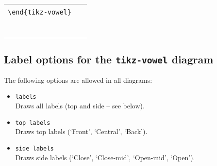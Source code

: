 \documentclass{article}
\newcommand{\pkg}[1]{\texttt{#1}}
\begin{document}
\begin{center}
\begin{tabular}{ll}
  \begin{minipage}[t]{6.5cm}{\small
    \verb|\begin{tikz-vowel}[triangle,three]|\\
    \verb|\end{tikz-vowel}|\\}
  \end{minipage} & 
  \begin{minipage}[t]{6.5cm}
  {~}
  \end{minipage} \\
  \begin{minipage}[t]{6.5cm}{
  \begin{tikz-vowel}\end{tikz-vowel} \\}\end{minipage} &
\end{tabular}
\end{center}



\subsection{Label options for the \pkg{tikz-vowel} diagram}
\label{sec:Label options for the tikz-vowel diagram}

\begin{minipage}[t]{\textwidth}
The following options are allowed in all diagrams:

\begin{itemize}\itemsep0pt
	\item \texttt{labels} \\\qquad Draws all labels (top and side -- see below).
	\item \texttt{top labels} \\\qquad Draws top labels (`Front', `Central', `Back').
	\item \texttt{side labels} \\\qquad Draws side labels (`Close', `Close-mid', `Open-mid', `Open').
\end{itemize}%
\end{minipage}%

\bigskip
\end{document}
